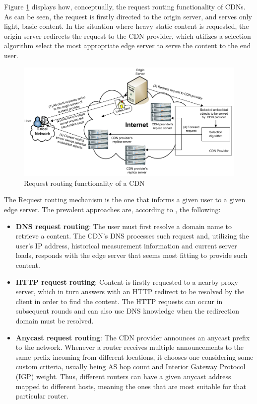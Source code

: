    Figure \ref{fig:cdn-request-routing} displays how, conceptually, the request routing functionality of CDNs.
    As can be seen, the request is firstly directed to the origin server, and serves only light, basic content.
    In the situation where heavy static content is requested, the origin server redirects the request to the CDN provider, which utilizes a selection algorithm select the most appropriate edge server to serve the content to the end user.

\begin{figure}[ht]
\centering
\includegraphics[scale=0.5]{img/cdn-request-routing.png}
\caption{Request routing functionality of a CDN \cite{cdn-survey}}
\label{fig:cdn-request-routing}
\end{figure}

    The Request routing mechanism is the one that informs a given user to a given edge server.
    The prevalent approaches are, according to \cite{wichtlhuber2017}, the following:

\begin{itemize}
    \item \textbf{DNS request routing}: The user must first resolve a domain name to retrieve a content. The CDN's DNS processes such request and, utilizing the user's IP address, historical measurement information and current server loads, responds with the edge server that seems most fitting to provide such content.
    \item \textbf{HTTP request routing}: Content is firstly requested to a nearby proxy server, which in turn answers with an HTTP redirect to be resolved by the client in order to find the content.
        The HTTP requests can occur in subsequent rounds and can also use DNS knowledge when the redirection domain must be resolved.
    \item \textbf{Anycast request routing}: The CDN provider announces an anycast prefix to the network.
        Whenever a router receives multiple announcements to the same prefix incoming from different locations, it chooses one considering some custom criteria, usually being AS hop count and Interior Gateway Protocol (IGP) weight.
        Thus, different routers can have a given anycast address mapped to different hosts, meaning the ones that are most suitable for that particular router.
\end{itemize}{}

